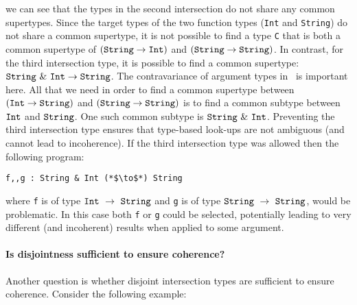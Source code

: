 \noindent we can see that the types in the 
second intersection do not share any common supertypes. Since the
target types of the two function types
(\lstinline$Int$ and \lstinline$String$) do not share a common
supertype, 
it is not possible to find a type \lstinline$C$ that is both a common
supertype of $(\texttt{String} \to \texttt{Int})$ and $(\texttt{String} \to \texttt{String})$.
In contrast, for the third intersection type, it is possible to find a 
common supertype: $\texttt{String}~\&~\texttt{Int} \to
\texttt{String}$. The contravariance of argument types
in ~is important here. All that we need in order to find a common supertype 
between $(\texttt{Int} \to \texttt{String})$ and $(\texttt{String} \to
\texttt{String})$ is to find a common subtype between $\texttt{Int}$ and 
$\texttt{String}$. One such common subtype is
$\texttt{String}~\&~\texttt{Int}$. Preventing the third intersection
type ensures that type-based look-ups are not ambiguous (and cannot
lead to incoherence). If the third intersection type was allowed then
the following program:

\begin{lstlisting}
f,,g : String & Int (*$\to$*) String
\end{lstlisting}

\noindent where \lstinline$f$ is of type
$\texttt{Int}~\to~\texttt{String}$  and \lstinline$g$ is of type
$\texttt{String}~\to~\texttt{String}$, would be problematic. In this 
case both \lstinline$f$ or \lstinline$g$ could be selected,
potentially leading to very different (and incoherent) results when
applied to some argument. 

\begin{comment}
According to the rule the first 
two intersection types are disjoint, whereas the last one is not. This 
rule is justified in Section~\ref{}.\bruno{Should we stop here; or briefly argue 
about some justification} 

This paper proposes the 
following rule for determining the disjointness of two function types:

\begin{mathpar}
    \ruledisfun
\end{mathpar}

\noindent Here $*_i$ denotes disjointness. 
\end{comment}

\paragraph {Is disjointness sufficient to ensure coherence?} Another question
is whether disjoint intersection types are sufficient to ensure coherence. 
Consider the following example:


